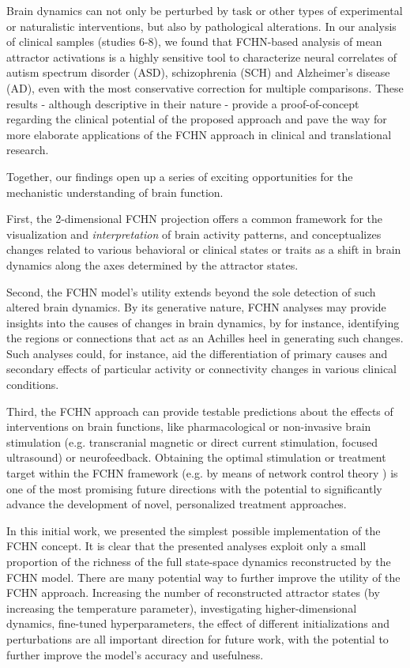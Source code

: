 \documentclass{article}
\begin{document}
Brain dynamics can not only be perturbed by task or other types of experimental or naturalistic interventions, but also by pathological alterations. In our analysis of clinical samples (studies 6-8), we found that FCHN-based analysis of mean attractor activations is a highly sensitive tool to characterize neural correlates of autism spectrum disorder (ASD), schizophrenia (SCH) and Alzheimer's disease (AD), even with the most conservative correction for multiple comparisons. These results - although descriptive in their nature - provide a proof-of-concept regarding the clinical potential of the proposed approach and pave the way for more elaborate applications of the FCHN approach in clinical and translational research.

Together, our findings open up a series of exciting opportunities for the mechanistic understanding of brain function.

First, the 2-dimensional FCHN projection offers a common framework for the visualization and \textit{interpretation} of brain activity patterns, and conceptualizes changes related to various behavioral or clinical states or traits as a shift in brain dynamics along the axes determined by the attractor states.

Second, the FCHN model's utility extends beyond the sole detection of such altered brain dynamics. By its generative nature, FCHN analyses may provide insights into the causes of changes in brain dynamics, by for instance, identifying the regions or connections that act as an Achilles heel in generating such changes. Such analyses could, for instance, aid the differentiation of primary causes and secondary effects of particular activity or connectivity changes in various clinical conditions.

Third, the FCHN approach can provide testable predictions about the effects of interventions on brain functions, like pharmacological or non-invasive brain stimulation (e.g. transcranial magnetic or direct current stimulation,
focused ultrasound) or neurofeedback. Obtaining the optimal stimulation or treatment target within the FCHN framework (e.g. by means of network control theory \citep{liu2011controllability}) is one of the most promising future directions with the potential to significantly advance the development of novel, personalized treatment approaches.

In this initial work, we presented the simplest possible implementation of the FCHN concept. It is clear that the presented analyses exploit only a small proportion of the richness of the full state-space dynamics reconstructed by the FCHN model.
There are many potential way to further improve the utility of the FCHN approach. Increasing the number of reconstructed attractor states (by increasing the temperature parameter), investigating higher-dimensional dynamics, fine-tuned hyperparameters, the effect of
different initializations and perturbations are all important direction for future work, with the potential to further improve the model's accuracy and usefulness.
\end{document}
